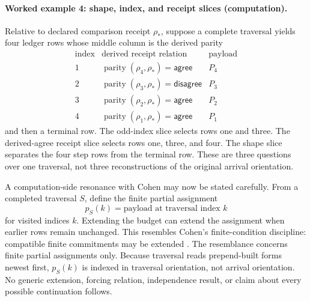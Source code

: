 \paragraph{Worked example 4: shape, index, and receipt slices (computation).}
Relative to declared comparison receipt \(\rho_*\), suppose a complete traversal yields four ledger rows whose middle
column is the derived parity
\[
\begin{array}{c|c|c}
\text{index}&\text{derived receipt relation}&\text{payload}\\
\hline
1&\operatorname{parity}(\rho_4,\rho_*)=\mathsf{agree}&P_4\\
2&\operatorname{parity}(\rho_3,\rho_*)=\mathsf{disagree}&P_3\\
3&\operatorname{parity}(\rho_2,\rho_*)=\mathsf{agree}&P_2\\
4&\operatorname{parity}(\rho_1,\rho_*)=\mathsf{agree}&P_1
\end{array}
\]
and then a terminal row.  The odd-index slice selects rows one and three.  The derived-agree receipt slice selects rows one,
three, and four.  The shape slice separates the four step rows from the terminal row.  These are three questions over
one traversal, not three reconstructions of the original arrival orientation.

A computation-side resonance with Cohen may now be stated carefully.  From a completed traversal \(S\), define the
finite partial assignment
\[
                       p_S(k)=\text{payload at traversal index }k
\]
for visited indices \(k\).  Extending the budget can extend the assignment when earlier rows remain unchanged.  This
resembles Cohen's finite-condition discipline: compatible finite commitments may be extended
\cite{cohen1963}.  The resemblance concerns finite partial assignments only.  Because traversal reads prepend-built
forms newest first, \(p_S(k)\) is indexed in traversal orientation, not arrival orientation.  No generic extension,
forcing relation, independence result, or claim about every possible continuation follows.

